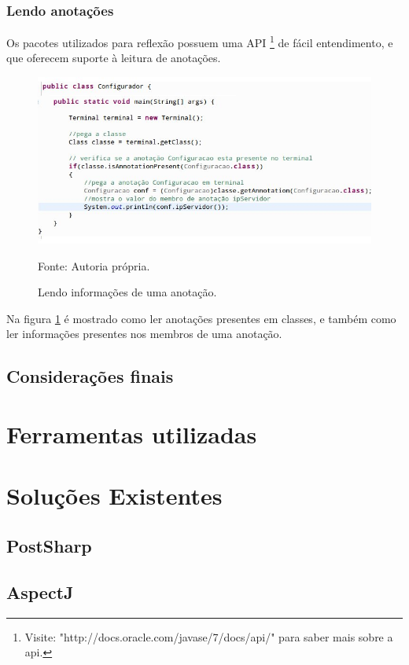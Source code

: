 \documentclass[tc,openright]{iiufrgs}
\begin{document}
\subsection{Lendo anotações}

Os pacotes utilizados para reflexão possuem uma API \footnote{Visite: "http://docs.oracle.com/javase/7/docs/api/"  para saber mais sobre a api.} de fácil entendimento, e que oferecem suporte à leitura de anotações.

\begin{figure}[ht]
	\centering
	\includegraphics[scale=0.6]{figuras/lendoAnnotation.jpg}
	\caption{Lendo informações de uma anotação.}
	\small{Fonte: Autoria própria.}
	\label{fig:lendoAnotacao}
\end{figure}

Na figura \ref{fig:lendoAnotacao} é mostrado como ler anotações presentes em classes, e também como ler informações presentes nos membros de uma anotação.

\section{Considerações finais}

\chapter{Ferramentas utilizadas}

\chapter{Soluções Existentes}

\section{PostSharp}

\section{AspectJ}
\end{document}
